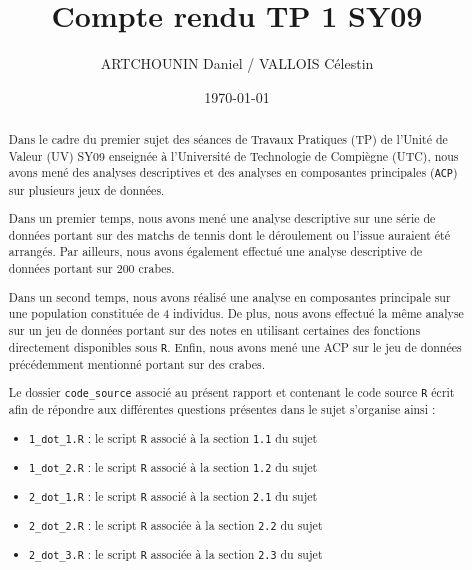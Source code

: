 \documentclass{article}
\title{Compte rendu TP 1 SY09}
\author{ARTCHOUNIN Daniel / VALLOIS Célestin}
\date{\today}
\begin{document}
\maketitle %

\thispagestyle{fancy} %



\begin{abstract}

Dans le cadre du premier sujet des séances de Travaux Pratiques (TP) de l'Unité de Valeur (UV) SY09 enseignée à l'Université de Technologie de Compiègne (UTC), nous avons mené des analyses descriptives et des analyses en composantes principales (\texttt{ACP}) sur plusieurs jeux de données.

Dans un premier temps, nous avons mené une analyse descriptive sur une série de données portant sur des matchs de tennis dont le déroulement ou l'issue auraient été arrangés. Par ailleurs, nous avons également effectué une analyse descriptive de données portant sur $200$ crabes.

Dans un second temps, nous avons réalisé une analyse en composantes principale sur une population constituée de $4$ individus. De plus, nous avons effectué la même analyse sur un jeu de données portant sur des notes en utilisant certaines des fonctions directement disponibles sous \texttt{R}. Enfin, nous avons mené une ACP sur le jeu de données précédemment mentionné portant sur des crabes. 

Le dossier \texttt{code\_source} associé au présent rapport et contenant le code source \texttt{R} écrit afin de répondre aux différentes questions présentes dans le sujet s'organise ainsi :

\begin{itemize}
  \item \texttt{1\_dot\_1.R} : le script \texttt{R} associé à la section \texttt{1.1} du sujet 
  \item \texttt{1\_dot\_2.R} : le script \texttt{R} associé à la section \texttt{1.2} du sujet 
  \item \texttt{2\_dot\_1.R} :  le script \texttt{R} associé à la section \texttt{2.1} du sujet 
  \item \texttt{2\_dot\_2.R} :  le script \texttt{R} associée à la section \texttt{2.2} du sujet 
  \item \texttt{2\_dot\_3.R} :  le script \texttt{R} associée à la section \texttt{2.3} du sujet 
\end{itemize}

\end{abstract}
\end{document}

